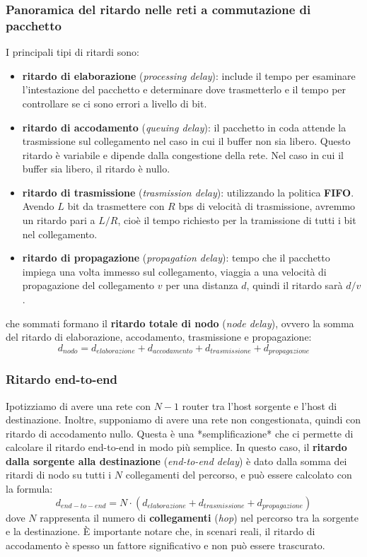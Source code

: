 \subsubsection{Panoramica del ritardo nelle reti a commutazione di pacchetto}
I principali tipi di ritardi sono:
\begin{itemize}
  \item \textbf{ritardo di elaborazione} (\textit{processing delay}): include il tempo per esaminare l'intestazione del pacchetto e determinare dove trasmetterlo e il tempo per controllare se ci sono errori a livello di bit.  
  \item \textbf{ritardo di accodamento} (\textit{queuing delay}): il pacchetto in coda attende la trasmissione sul collegamento nel caso in cui il buffer non sia libero. Questo ritardo è variabile e dipende dalla congestione della rete. Nel caso in cui il buffer sia libero, il ritardo è nullo.
  \item \textbf{ritardo di trasmissione} (\textit{trasmission delay}): utilizzando la politica \textbf{FIFO}. Avendo $L$ bit da trasmettere con $R$ bps di velocità di trasmissione, avremmo un ritardo pari a $L/R$, cioè il tempo richiesto per la tramissione di tutti i bit nel collegamento. 
  \item \textbf{ritardo di propagazione} (\textit{propagation delay}): tempo che il pacchetto impiega una volta immesso sul collegamento, viaggia a una velocità di propagazione del collegamento $v$ per una distanza $d$, quindi il ritardo sarà $d/v$.  
\end{itemize}
che sommati formano il \textbf{ritardo totale di nodo} (\textit{node delay}), ovvero la somma del ritardo di elaborazione, accodamento, trasmissione e propagazione:
\[
  d_{nodo} = d_{elaborazione} + d_{accodamento} + d_{trasmissione} + d_{propagazione} 
\]

\subsubsection{Ritardo end-to-end}
Ipotizziamo di avere una rete con $N - 1$ router tra l'host sorgente e l'host di destinazione. Inoltre, supponiamo di avere una rete non congestionata, quindi con ritardo di accodamento nullo. Questa è una *semplificazione* che ci permette di calcolare il ritardo end-to-end in modo più semplice. In questo caso, il \textbf{ritardo dalla sorgente alla destinazione} (\textit{end-to-end delay}) è dato dalla somma dei ritardi di nodo su tutti i $N$ collegamenti del percorso, e può essere calcolato con la formula:
\[
  d_{end-to-end} = N \cdot (d_{elaborazione} + d_{trasmissione} + d_{propagazione})
\]
dove $N$ rappresenta il numero di \textbf{collegamenti} (\textit{hop}) nel percorso tra la sorgente e la destinazione. È importante notare che, in scenari reali, il ritardo di accodamento è spesso un fattore significativo e non può essere trascurato.

